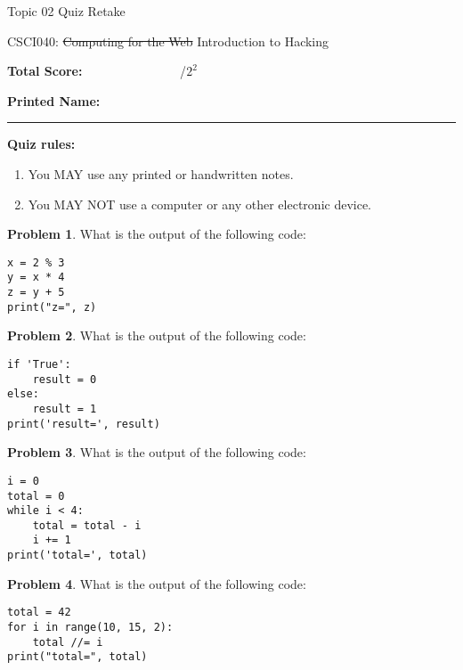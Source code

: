 \documentclass[10pt]{article}
\theoremstyle{definition}
\newtheorem{problem}{Problem}
\begin{document}
\begin{center}
    {
\Large
    Topic 02 Quiz Retake
}

    \vspace{0.1in}
    CSCI040: \sout{Computing for the Web} Introduction to Hacking

    \vspace{0.1in}
\end{center}

\vspace{0.15in}
\noindent
\textbf{Total Score:} ~~~~~~~~~~~~~~~/$2^2$

\vspace{0.5in}
\noindent
\textbf{Printed Name:}

\noindent
\rule{\textwidth}{0.1pt}
\vspace{0.25in}

\noindent
\textbf{Quiz rules:}
\begin{enumerate}
    \item You MAY use any printed or handwritten notes.
    \item You MAY NOT use a computer or any other electronic device.
\end{enumerate}

\noindent

\vspace{0.15in}

\begin{problem}
    What is the output of the following code:
\end{problem}
\begin{lstlisting}
x = 2 % 3
y = x * 4
z = y + 5
print("z=", z)
\end{lstlisting}
\vspace{0.1in}

\begin{problem}
    What is the output of the following code:
\end{problem}
\begin{lstlisting}
if 'True':
    result = 0
else:
    result = 1
print('result=', result)
\end{lstlisting}
\vspace{0.1in}

\begin{problem}
    What is the output of the following code:
\end{problem}
\begin{lstlisting}
i = 0
total = 0
while i < 4:
    total = total - i
    i += 1
print('total=', total)
\end{lstlisting}
\vspace{0.1in}

\begin{problem}
    What is the output of the following code:
\end{problem}
\begin{lstlisting}
total = 42
for i in range(10, 15, 2):
    total //= i
print("total=", total)
\end{lstlisting}
\vspace{0.1in}
\end{document}
